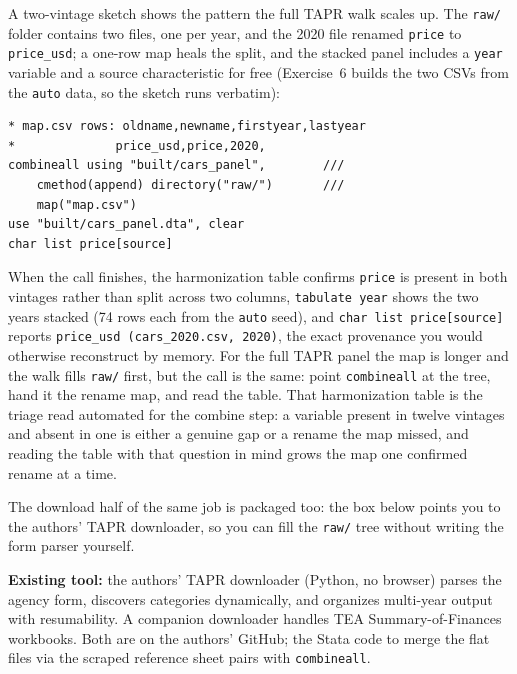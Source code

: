\documentclass[
    a4paper,
    fontsize=10pt,
    twoside=true,
    numbers=noenddot,
]{kaobook}
\begin{document}
A two-vintage sketch shows the pattern the full TAPR walk scales up. The \texttt{raw/} folder contains two files, one per year, and the 2020 file renamed \texttt{price} to \texttt{price\_usd}; a one-row map heals the split, and the stacked panel includes a \texttt{year} variable and a source characteristic for free (Exercise~6 builds the two CSVs from the \texttt{auto} data, so the sketch runs verbatim):
\par
{\footnotesize
\begin{verbatim}
* map.csv rows: oldname,newname,firstyear,lastyear
*              price_usd,price,2020,
combineall using "built/cars_panel",        ///
    cmethod(append) directory("raw/")       ///
    map("map.csv")
use "built/cars_panel.dta", clear
char list price[source]
\end{verbatim}
}
When the call finishes, the harmonization table confirms \texttt{price} is present in both vintages rather than split across two columns, \texttt{tabulate year} shows the two years stacked (74 rows each from the \texttt{auto} seed), and \texttt{char list price[source]} reports \texttt{price\_usd (cars\_2020.csv, 2020)}, the exact provenance you would otherwise reconstruct by memory. For the full TAPR panel the map is longer and the walk fills \texttt{raw/} first, but the call is the same: point \texttt{combineall} at the tree, hand it the rename map, and read the table. That harmonization table is the triage read automated for the combine step: a variable present in twelve vintages and absent in one is either a genuine gap or a rename the map missed, and reading the table with that question in mind grows the map one confirmed rename at a time.

The download half of the same job is packaged too: the box below points you to the authors' TAPR downloader, so you can fill the \texttt{raw/} tree without writing the form parser yourself.

\begin{kaobox}[frametitle=Package Integration: \texttt{TEA-TAPR-download}]
\textbf{Existing tool:} the authors' TAPR downloader (Python, no browser) parses the agency form, discovers categories dynamically, and organizes multi-year output with resumability. A companion downloader handles TEA Summary-of-Finances workbooks. Both are on the authors' GitHub; the Stata code to merge the flat files via the scraped reference sheet pairs with \texttt{combineall}.
\end{kaobox}

\end{document}
